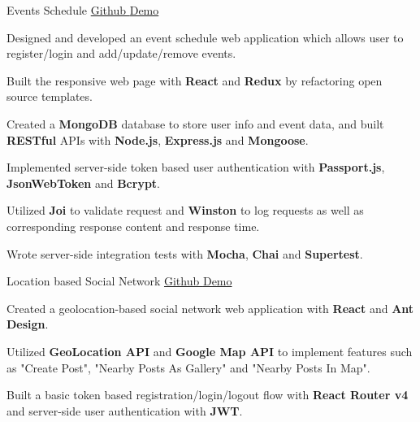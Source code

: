 \begin{cvprojects}
  \cvproject
    {Events Schedule}
    {\href{https://github.com/wuhxxx/event-schedule}{Github  }}
    {\href{https://event-schedule-app.herokuapp.com}{  Demo}}
    {
      \begin{cvitems}
        \item {Designed and developed an event schedule web application which allows user to register/login and add/update/remove events.}
        \item {Built the responsive web page with \textbf{React} and \textbf{Redux} by refactoring open source templates.}
        \item {Created a \textbf{MongoDB} database to store user info and event data, and built \textbf{RESTful} APIs with \textbf{Node.js}, \textbf{Express.js} and \textbf{Mongoose}.}
        \item {Implemented server-side token based user authentication with \textbf{Passport.js}, \textbf{JsonWebToken} and \textbf{Bcrypt}.}
        \item {Utilized \textbf{Joi} to validate request and \textbf{Winston} to log requests as well as corresponding response content and response time.}
        \item {Wrote server-side integration tests with \textbf{Mocha}, \textbf{Chai} and \textbf{Supertest}.}
      \end{cvitems}
    }
    
  \cvproject
    {Location based Social Network}
    {\href{https://github.com/wuhxxx/around}{Github  }}
    {\href{https://around-web.herokuapp.com}{  Demo}}
    {
      \begin{cvitems}
        \item {Created a geolocation-based social network web application with \textbf{React} and \textbf{Ant Design}.}
        \item {Utilized \textbf{GeoLocation API} and \textbf{Google Map API} to implement features such as "Create Post", "Nearby Posts As Gallery" and "Nearby Posts In Map".}
        \item {Built a basic token based registration/login/logout flow with \textbf{React Router v4} and server-side user authentication with \textbf{JWT}.}
      \end{cvitems}
    }
    

\end{cvprojects}
